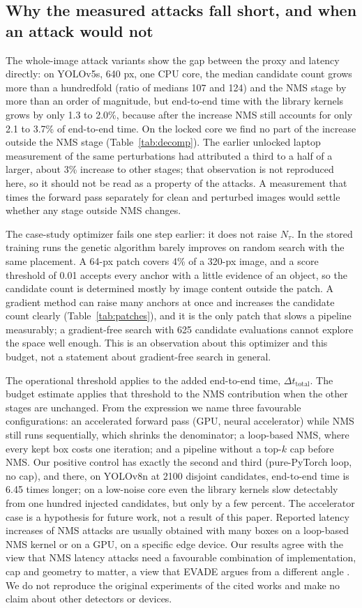 \documentclass[a4paper,fleqn]{cas-dc}
\newcommand{\Ntau}{N_{\tau}}
\begin{document}
\subsection{Why the measured attacks fall short, and when an attack would not}
The whole-image attack variants show the gap between the proxy and latency directly: on YOLOv5s, 640 px, one CPU core, the median candidate count grows more than a hundredfold (ratio of medians 107 and 124) and the NMS stage by more than an order of magnitude, but end-to-end time with the library kernels grows by only 1.3 to 2.0\%, because after the increase NMS still accounts for only 2.1 to 3.7\% of end-to-end time. On the locked core we find no part of the increase outside the NMS stage (Table~\ref{tab:decomp}). The earlier unlocked laptop measurement of the same perturbations had attributed a third to a half of a larger, about 3\% increase to other stages; that observation is not reproduced here, so it should not be read as a property of the attacks. A measurement that times the forward pass separately for clean and perturbed images would settle whether any stage outside NMS changes.

The case-study optimizer fails one step earlier: it does not raise $\Ntau$. In the stored training runs the genetic algorithm barely improves on random search with the same placement. A 64-px patch covers 4\% of a 320-px image, and a score threshold of 0.01 accepts every anchor with a little evidence of an object, so the candidate count is determined mostly by image content outside the patch. A gradient method can raise many anchors at once and increases the candidate count clearly (Table~\ref{tab:patches}), and it is the only patch that slows a pipeline measurably; a gradient-free search with 625 candidate evaluations cannot explore the space well enough. This is an observation about this optimizer and this budget, not a statement about gradient-free search in general.

The operational threshold applies to the added end-to-end time, $\Delta t_{\mathrm{total}}$. The budget estimate applies that threshold to the NMS contribution when the other stages are unchanged. From the expression we name three favourable configurations: an accelerated forward pass (GPU, neural accelerator) while NMS still runs sequentially, which shrinks the denominator; a loop-based NMS, where every kept box costs one iteration; and a pipeline without a top-$k$ cap before NMS. Our positive control has exactly the second and third (pure-PyTorch loop, no cap), and there, on YOLOv8n at 2100 disjoint candidates, end-to-end time is 6.45 times longer; on a low-noise core even the library kernels slow detectably from one hundred injected candidates, but only by a few percent. The accelerator case is a hypothesis for future work, not a result of this paper. Reported latency increases of NMS attacks are usually obtained with many boxes on a loop-based NMS kernel or on a GPU, on a specific edge device. Our results agree with the view that NMS latency attacks need a favourable combination of implementation, cap and geometry to matter, a view that EVADE argues from a different angle \cite{evade2025}. We do not reproduce the original experiments of the cited works and make no claim about other detectors or devices.
\end{document}
